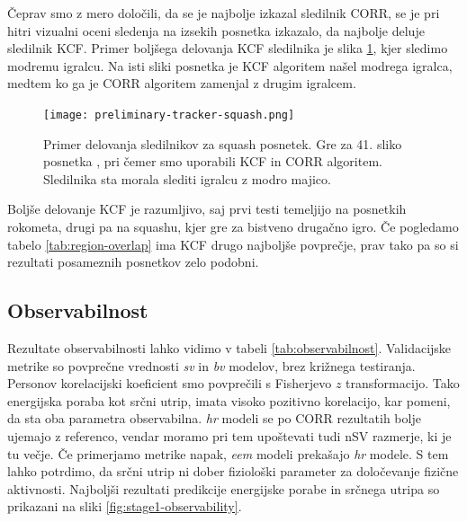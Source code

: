 Čeprav smo z mero določili, da se je najbolje izkazal sledilnik CORR, se je pri hitri vizualni oceni sledenja na izsekih posnetka \cite{squashtv2014squash} izkazalo, da najbolje deluje sledilnik KCF. Primer boljšega delovanja KCF sledilnika je slika \ref{fig:squash-tracker-visual}, kjer sledimo modremu igralcu. Na isti sliki posnetka je KCF algoritem našel modrega igralca, medtem ko ga je CORR algoritem zamenjal z drugim igralcem. 



\begin{figure}[!htbp]
	\centering
	\texttt{[image: preliminary-tracker-squash.png]}
	\caption{}
	\caption[Primer delovanja sledilnikov za squash posnetek]{Primer delovanja sledilnikov za squash posnetek. Gre za 41. sliko posnetka \cite{squashtv2014squash}, pri čemer smo uporabili KCF in CORR algoritem. Sledilnika sta morala slediti igralcu z modro majico.}
	\label{fig:squash-tracker-visual}
\end{figure}


Boljše delovanje KCF je razumljivo, saj prvi testi temeljijo na posnetkih rokometa, drugi pa na squashu, kjer gre za bistveno drugačno igro. Če pogledamo tabelo \ref{tab:region-overlap} ima KCF drugo najboljše povprečje, prav tako pa so si rezultati posameznih posnetkov zelo podobni. 


















\subsection{Observabilnost}
Rezultate observabilnosti lahko vidimo v tabeli \ref{tab:observabilnost}. Validacijske metrike so povprečne vrednosti \textit{sv} in \textit{bv} modelov, brez križnega testiranja.  Personov korelacijski koeficient smo povprečili s Fisherjevo $z$ transformacijo. Tako energijska poraba kot srčni utrip, imata visoko pozitivno korelacijo, kar pomeni, da sta oba parametra observabilna. \textit{hr} modeli se po CORR rezultatih bolje ujemajo z referenco, vendar moramo pri tem upoštevati tudi nSV razmerje, ki je tu večje. Če primerjamo metrike napak, \textit{eem} modeli prekašajo \textit{hr} modele. S tem lahko potrdimo, da srčni utrip ni dober fiziološki parameter za določevanje fizične aktivnosti. Najboljši rezultati predikcije energijske porabe in srčnega utripa so prikazani na sliki \ref{fig:stage1-observability}.


